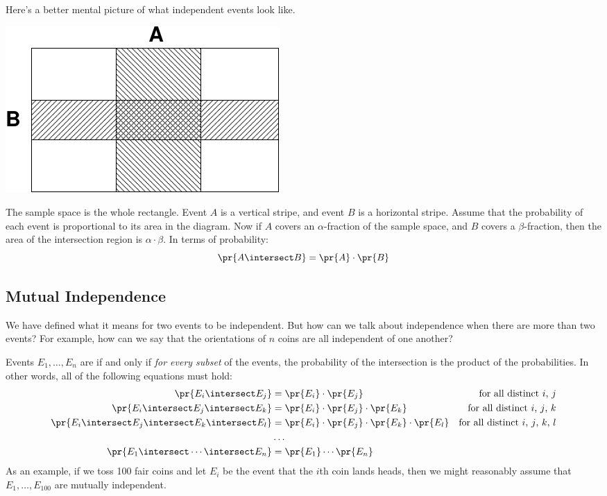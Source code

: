 Here's a better mental picture of what independent events look like.
%
\begin{center}
\includegraphics{figures/independent-events}
\end{center}
%
The sample space is the whole rectangle.  Event $A$ is a vertical
stripe, and event $B$ is a horizontal stripe.  Assume that the
probability of each event is proportional to its area in the diagram.
Now if $A$ covers an $\alpha$-fraction of the sample space, and $B$
covers a $\beta$-fraction, then the area of the intersection region is
$\alpha \cdot \beta$.  In terms of probability:
%
\[
\pr{A \intersect B} = \pr{A} \cdot \pr{B}
\]
\fi

\subsection{Mutual Independence}

We have defined what it means for two events to be independent.  But
how can we talk about independence when there are more than two
events?  For example, how can we say that the orientations of $n$
coins are all independent of one another?

Events $E_1, \ldots, E_n$ are  if and only
if \textit{for every subset} of the events, the probability of the
intersection is the product of the probabilities.  In other words, all
of the following equations must hold:
%
\begin{align*}
\pr{E_i \intersect E_j}
    & = \pr{E_i} \cdot \pr{E_j}
    & \text{for all distinct $i$, $j$} \\
\pr{E_i \intersect E_j \intersect E_k}
    & = \pr{E_i} \cdot \pr{E_j} \cdot \pr{E_k}
     & \text{for all distinct $i$, $j$, $k$} \\
\pr{E_i \intersect E_j \intersect E_k \intersect E_l}
    & = \pr{E_i} \cdot \pr{E_j} \cdot \pr{E_k} \cdot \pr{E_l}
    & \text{for all distinct $i$, $j$, $k$, $l$} \\
    & \ldots \\
\pr{E_1 \intersect \cdots \intersect E_n} & = \pr{E_1} \cdots \pr{E_n}
\end{align*}
%
As an example, if we toss 100 fair coins and let $E_i$ be the event
that the $i$th coin lands heads, then we might reasonably assume that
$E_1, \dots, E_{100}$ are mutually independent.


